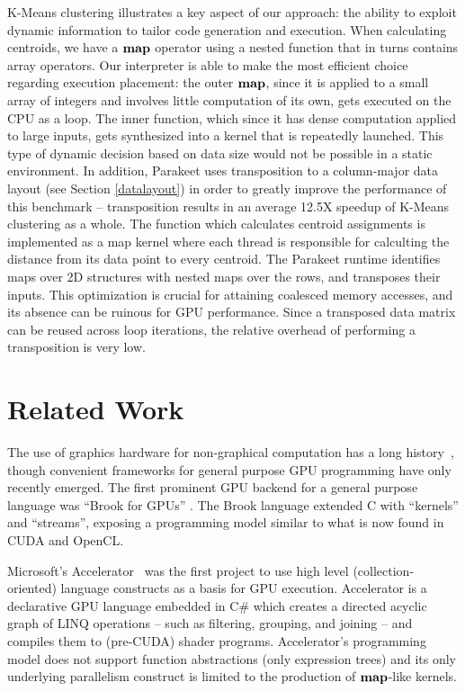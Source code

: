 \documentclass[10pt,twocolumn]{article}
\begin{document}
K-Means clustering illustrates a key aspect of our approach: the ability to exploit dynamic information to tailor code generation and execution.  When calculating centroids, we have a $\mbox{\textbf{map}}$ operator using a nested function that in turns contains array operators.  Our interpreter is able to make the most efficient choice regarding execution placement: the outer $\mbox{\textbf{map}}$, since it is applied to a small array of integers and involves little computation of its own, gets executed on the CPU as a loop.  The inner function, which since it has dense computation applied to large inputs, gets synthesized into a kernel that is repeatedly launched.  This type of dynamic decision based on data size would not be possible in a static environment.  In addition, Parakeet uses transposition to a column-major data layout (see Section \ref{datalayout}) in order to greatly improve the performance of this benchmark -- transposition results in an average 12.5X speedup of K-Means clustering as a whole. The function which calculates centroid assignments is implemented as a map kernel where each thread is responsible for calculting the distance from its data point to every centroid. The Parakeet runtime identifies maps over 2D structures with nested maps over the rows, and transposes their inputs. This optimization is crucial for attaining coalesced memory accesses, and its absence can be ruinous for GPU performance.  Since a transposed data matrix can be reused across loop iterations, the relative overhead of performing a transposition is very low.

\section{Related Work}
\label{RelatedWork}
The use of graphics hardware for non-graphical computation has a  long history~\cite{Leng90}, though convenient frameworks for general purpose GPU programming have only recently emerged. The first prominent GPU backend for a general purpose language was ``Brook for GPUs'' \cite{Buck04}. The Brook language extended C with ``kernels'' and ``streams'', exposing a programming model similar to what is now found in CUDA and OpenCL.

Microsoft's Accelerator~\cite{Tard06} was the first project to use high level (collection-oriented) language constructs as a basis for GPU execution. Accelerator is a declarative GPU language embedded in C\# which creates a directed acyclic graph of LINQ operations -- such as filtering, grouping, and joining -- and compiles them to (pre-CUDA) shader programs. Accelerator's programming model does not support function abstractions (only expression trees) and its only underlying parallelism construct is limited to the production of $\mbox{\textbf{map}}$-like kernels.
\end{document}
